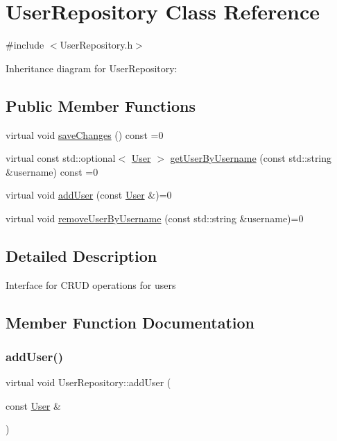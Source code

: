 \hypertarget{classUserRepository}{}\section{User\+Repository Class Reference}
\label{classUserRepository}


{\ttfamily \#include $<$User\+Repository.\+h$>$}



Inheritance diagram for User\+Repository\+:
\subsection*{Public Member Functions}
\begin{DoxyCompactItemize}
\item 
virtual void \hyperlink{classUserRepository_a282496e98e0cc0d377531575047adeab}{save\+Changes} () const =0
\item 
virtual const std\+::optional$<$ \hyperlink{classUser}{User} $>$ \hyperlink{classUserRepository_aeb49a2995f19e516e9d068cb082a9535}{get\+User\+By\+Username} (const std\+::string \&username) const =0
\item 
virtual void \hyperlink{classUserRepository_a0c4379dccea3126340993453b8156787}{add\+User} (const \hyperlink{classUser}{User} \&)=0
\item 
virtual void \hyperlink{classUserRepository_a32dbae2d045588d858b8f21550987577}{remove\+User\+By\+Username} (const std\+::string \&username)=0
\end{DoxyCompactItemize}


\subsection{Detailed Description}
Interface for C\+R\+UD operations for users 

\subsection{Member Function Documentation}
\mbox{\label{classUserRepository_a0c4379dccea3126340993453b8156787}} 
\subsubsection{\texorpdfstring{add\+User()}{addUser()}}
{\footnotesize\ttfamily virtual void User\+Repository\+::add\+User (\begin{DoxyParamCaption}\item[{const \hyperlink{classUser}{User} \&}]{ }\end{DoxyParamCaption})\hspace{0.3cm}{\ttfamily [pure virtual]}}


